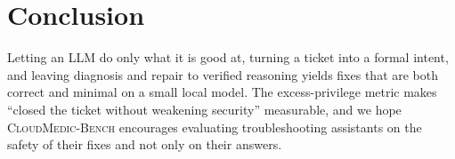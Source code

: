 \documentclass[conference]{IEEEtran}
\newcommand{\bench}{\textsc{CloudMedic-Bench}}
\begin{document}
\section{Conclusion}
Letting an LLM do only what it is good at, turning a ticket into a formal intent, and leaving diagnosis and repair to verified
reasoning yields fixes that are both correct and minimal on a small local model. The excess-privilege metric makes
``closed the ticket without weakening security'' measurable, and we hope \bench{} encourages evaluating troubleshooting
assistants on the safety of their fixes and not only on their answers.



\end{document}
